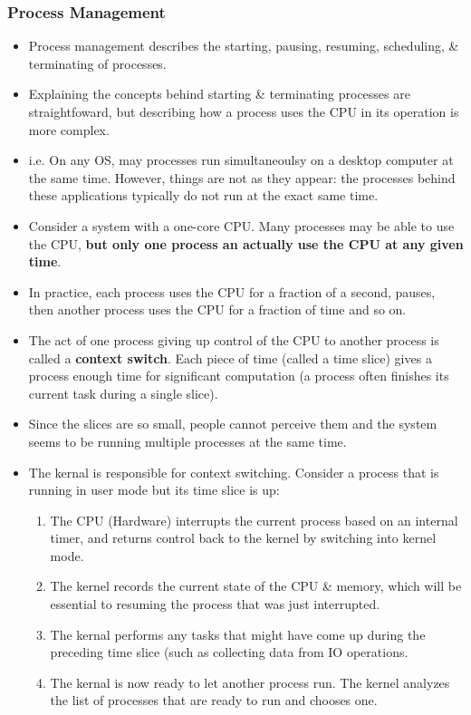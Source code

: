 \documentclass{article}
\begin{document}
	\subsubsection{Process Management}
	\begin{itemize}
		\item Process management describes the starting, pausing, resuming, scheduling, \& terminating of processes.
		\item Explaining the concepts behind starting \& terminating processes are straightfoward, but describing how a process uses the CPU in its operation is more complex.
		\item i.e. On any OS, may processes run simultaneoulsy on a desktop computer at the same time. However, things are not as they appear: the processes behind these applications typically do not run at the exact same time.
		\item Consider a system with a one-core CPU. Many processes may be able to use the CPU, {\bf but only one process an actually use the CPU at any given time}.
		\item In practice, each process uses the CPU for a fraction of a second, pauses, then another process uses the CPU for a fraction of time and so on.
		\item The act of one process giving up control of the CPU to another process is called a {\bf context switch}. Each piece of time (called a time slice) gives a process enough time for significant computation (a process often finishes its current task during a single slice).
		\item Since the slices are so small, people cannot perceive them and the system seems to be running multiple processes at the same time.	
		\item The kernal is responsible for context switching. Consider a process that is running in user mode but its time slice is up:
			\begin{enumerate}
				\item The CPU (Hardware) interrupts the current process based on an internal timer, and returns control back to the kernel by switching into kernel mode.
				\item The kernel records the current state of the CPU \& memory, which will be essential to resuming the process that was just interrupted.
				\item The kernal performs any tasks that might have come up during the preceding time slice (such as collecting data from IO operations.
				\item The kernal is now ready to let another process run. The kernel analyzes the list of processes that are ready to run and chooses one.

\end{enumerate}
\end{itemize}
\end{document}
